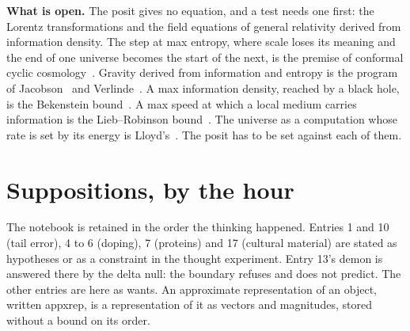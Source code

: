 \textbf{What is open.} The posit gives no equation, and a test needs one first: the Lorentz
transformations and the field equations of general relativity derived from information density. The
step at max entropy, where scale loses its meaning and the end of one universe becomes the start
of the next, is the premise of conformal cyclic cosmology~\cite{src:Penrose-2010}. Gravity derived
from information and entropy is the program of Jacobson~\cite{src:Jacobson-1995} and
Verlinde~\cite{src:Verlinde-2011}. A max information density, reached by a black hole, is the
Bekenstein bound~\cite{src:Bekenstein-1981}. A max speed at which a local medium carries
information is the Lieb--Robinson bound~\cite{src:Lieb-and-Robinson-1972}. The universe as a
computation whose rate is set by its energy is Lloyd's~\cite{src:Lloyd-2002}. The posit has to be set
against each of them.

\section{Suppositions, by the hour}

The notebook is retained in the order the thinking happened. Entries 1 and 10 (tail error), 4 to 6
(doping), 7 (proteins) and 17 (cultural material) are stated as hypotheses or as a constraint in the
thought experiment. Entry 13's demon is answered there by the delta null: the boundary refuses and
does not predict. The other entries are here as wants. An approximate representation of an object,
written appxrep, is a representation of it as vectors and magnitudes, stored without a bound on its
order.

